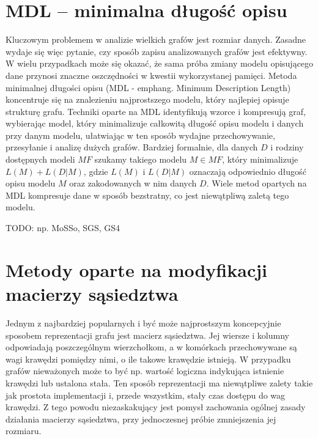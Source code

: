 \section{MDL -- minimalna długość opisu}
    Kluczowym problemem w analizie wielkich grafów jest rozmiar danych. Zasadne wydaje się więc pytanie, czy sposób zapisu analizowanych grafów jest efektywny. W wielu przypadkach może się okazać, że sama próba zmiany modelu opisującego dane przynosi znaczne oszczędności w kwestii wykorzystanej pamięci. Metoda minimalnej długości opisu (MDL - emph{ang. Minimum Description Length}) koncentruje się na znalezieniu najprostszego modelu, który najlepiej opisuje strukturę grafu. Techniki oparte na MDL identyfikują wzorce i kompresują graf, wybierając model, który minimalizuje całkowitą długość opisu modelu i danych przy danym modelu, ułatwiając w ten sposób wydajne przechowywanie, przesyłanie i analizę dużych grafów. Bardziej formalnie, dla danych $D$ i rodziny dostępnych modeli $MF$ szukamy takiego modelu $M \in MF$, który minimalizuje $L(M) + L(D|M)$, gdzie $L(M)$ i $L(D|M)$ oznaczają odpowiednio długość opisu modelu $M$ oraz zakodowanych w nim danych $D$. Wiele metod opartych na MDL kompresuje dane w sposób bezstratny, co jest niewątpliwą zaletą tego modelu. 

    TODO: np. MoSSo\cite{Ko_Kook_Shin_2020}, SGS\cite{Ma_Liu_Yang_Yang_Li_2022}, GS4\cite{Ashrafi-Payaman_Kangavari_Hosseini_Fander_2020}

\section{Metody oparte na modyfikacji macierzy sąsiedztwa}
    Jednym z najbardziej popularnych i być może najprostszym koncepcyjnie sposobem reprezentacji grafu jest macierz sąsiedztwa. Jej wiersze i kolumny odpowiadają poszczególnym wierzchołkom, a w komórkach przechowywane są wagi krawędzi pomiędzy nimi, o ile takowe krawędzie istnieją. W przypadku grafów nieważonych może to być np. wartość logiczna indykująca istnienie krawędzi lub ustalona stała. Ten sposób reprezentacji ma niewątpliwe zalety takie jak prostota implementacji i, przede wszystkim, stały czas dostępu do wag krawędzi. Z tego powodu niezaskakujący jest pomysł zachowania ogólnej zasady działania macierzy sąsiedztwa, przy jednoczesnej próbie zmniejszenia jej rozmiaru.     

